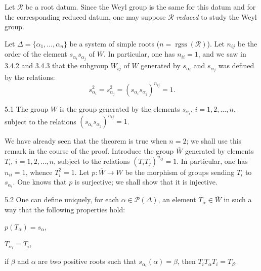 \label{XXI.sec.5}
Let $\mathcal R$ be a root datum. Since the Weyl group is the same for this datum and for the corresponding reduced datum, one may suppose $\mathcal R$ \emph{reduced} to study the Weyl group.

Let $\Delta=\{\alpha_1,\ldots,\alpha_n\}$ be a system of simple roots ($n=\operatorname{rgss}(\mathcal R)$). Let $n_{ij}$ be the order of the element $s_{\alpha_i}s_{\alpha_j}$ of $W$. In particular, one has $n_{ii}=1$, and we saw in 3.4.2 and 3.4.3 that the subgroup $W_{ij}$ of $W$ generated by $s_{\alpha_i}$ and $s_{\alpha_j}$ was defined by the relations:
\[
s_{\alpha_i}^2=s_{\alpha_j}^2=(s_{\alpha_i}s_{\alpha_j})^{n_{ij}}=1.
\]
\begin{theorem}{5.1}\label{XXI.5.1}
The group $W$ is the group generated by the elements $s_{\alpha_i}$, $i=1,2,\ldots,n$, subject to the relations $(s_{\alpha_i}s_{\alpha_j})^{n_{ij}}=1$.
\end{theorem}
We have already seen that the theorem is true when $n=2$; we shall use this remark in the course of the proof. Introduce the group $\overline W$ generated by elements $T_i$, $i=1,2,\ldots,n$, subject to the relations $(T_iT_j)^{n_{ij}}=1$. In particular, one has $n_{ii}=1$, whence $T_i^2=1$. Let $p:\overline W\to W$ be the morphism of groups sending $T_i$ to $s_{\alpha_i}$. One knows that $p$ is surjective; we shall show that it is injective.
\begin{lemma}{5.2}\label{XXI.5.2}
One can define uniquely, for each $\alpha\in\mathcal P(\Delta)$, an element $T_\alpha\in\overline W$ in such a way that the following properties hold:
\begin{enumeratei}
\item $p(T_\alpha)=s_\alpha$,
\item $T_{\alpha_i}=T_i$,
\item if $\beta$ and $\alpha$ are two positive roots such that $s_{\alpha_i}(\alpha)=\beta$, then $T_iT_\alpha T_i=T_\beta$.
\end{enumeratei}
\end{lemma}
